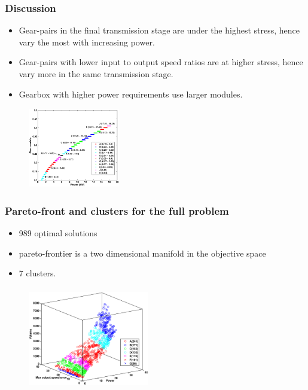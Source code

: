 \documentclass[svgnames, table, smaller]{beamer}
\begin{document}
\begin{frame}
  \frametitle{Discussion}
  
  \begin{itemize}
  \item Gear-pairs in the final transmission stage are under the highest
    stress, hence vary the most with increasing power.
  \item Gear-pairs with lower input to output speed ratios are at higher
    stress, hence vary more in the same transmission stage.
  \item Gearbox with higher power requirements use larger modules.
  \end{itemize}


  \begin{figure}[ht]\begin{center}
      \includegraphics[width=40mm, height=35mm]{dia/gt11pVsm.eps}
      \label{gt11pVsm}
    \end{center}
  \end{figure}

\end{frame}


\begin{frame}
  \frametitle{Pareto-front and clusters for the full problem}

  \begin{itemize}
  \item 989 optimal solutions 
  \item pareto-frontier is a two dimensional manifold in the objective
    space
  \item 7 clusters.
  \end{itemize}

  \begin{figure}[ht]\begin{center}
      \includegraphics[width=53mm, height=45mm]{dia/gtvopareto2.eps}
      \label{gtvClusters}
    \end{center}
  \end{figure}


\end{frame}
\end{document}
